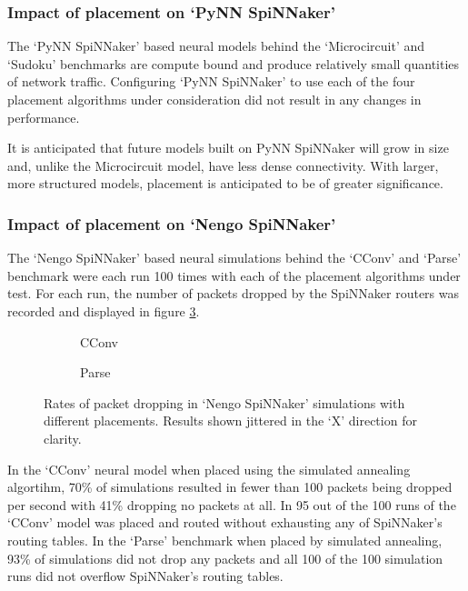 			\subsubsection{Impact of placement on `PyNN SpiNNaker'}
				
				The `PyNN SpiNNaker' based neural models behind the `Microcircuit' and
				`Sudoku' benchmarks are compute bound and produce relatively small
				quantities of network traffic. Configuring `PyNN SpiNNaker' to use each
				of the four placement algorithms under consideration did not result in
				any changes in performance.
				
				It is anticipated that future models built on PyNN SpiNNaker will grow
				in size and, unlike the Microcircuit model, have less dense
				connectivity. With larger, more structured models, placement is
				anticipated to be of greater significance.
			
			\subsubsection{Impact of placement on `Nengo SpiNNaker'}
				
				The `Nengo SpiNNaker' based neural simulations behind the `CConv' and
				`Parse' benchmark were each run \num{100} times with each of the
				placement algorithms under test. For each run, the number of packets
				dropped by the SpiNNaker routers was recorded and displayed in figure
				\ref{fig:nengo-dropped-packets}.
				
				\begin{figure}
					\center
					\begin{subfigure}{0.45\linewidth}
						
						\caption{CConv}
						\label{fig:cconv-dropped-packets}
					\end{subfigure}
					\begin{subfigure}{0.45\linewidth}
						
						\caption{Parse}
						\label{fig:parse-dropped-packets}
					\end{subfigure}
					
					\caption{Rates of packet dropping in `Nengo SpiNNaker' simulations
					with different placements. Results shown jittered in the `X'
					direction for clarity.}
					\label{fig:nengo-dropped-packets}
				\end{figure}
				
				In the `CConv' neural model when placed using the simulated annealing
				algortihm, 70\% of simulations resulted in fewer than 100 packets being
				dropped per second with 41\% dropping no packets at all. In 95 out of
				the 100 runs of the `CConv' model was placed and routed without
				exhausting any of SpiNNaker's routing tables. In the `Parse' benchmark
				when placed by simulated annealing, 93\% of simulations did not drop
				any packets and all 100 of the 100 simulation runs did not overflow
				SpiNNaker's routing tables.
				
